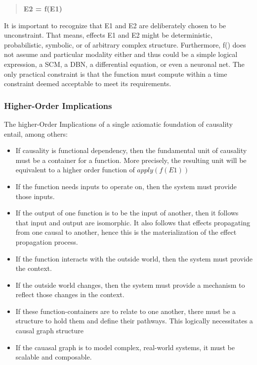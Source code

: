 \begin{quotation}
	\textbf{E2 = f(E1)}
\end{quotation}

It is important to recognize that E1 and E2 are deliberately chosen to be unconstraint. That means, effects E1 and E2 might be deterministic, probabilistic, symbolic, or of arbitrary complex structure. Furthermore, f() does not assume and particular modality either and thus could be a simple logical expression, a SCM, a DBN, a differential equation, or even a neuronal net. The only practical constraint is that the function must compute within a time constraint deemed acceptable to meet its requirements. 

\subsubsection{Higher-Order Implications}


The higher-Order Implications of a single axiomatic foundation of causality entail, among others:

\begin{itemize}
	\item If causality is functional dependency, then the fundamental unit of causality must be a container for a function. More precisely, the resulting unit will be equivalent to a higher order function of $apply(f(E1))$
	\item If the function needs inputs to operate on, then the system must provide those inputs.  
	\item If the output of one function is to be the input of another, then it follows that input and output are isomorphic. It also follows that effects propagating from one causal to another, hence this is the materialization of the effect propagation process. 
	\item If the function interacts with the outside world, then the system must provide the context. 
	\item If the outside world changes, then the system must provide a mechanism to reflect those changes in the context. 
	\item If these function-containers are to relate to one another, there must be a structure to hold them and define their pathways. This logically necessitates a causal graph structure
	\item If the cauasal graph is to model complex, real-world systems, it must be scalable and composable. 
\end{itemize}

